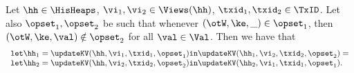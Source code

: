 
\begin{proposition}
Let $\hh \in \HisHeaps$, $\vi_1, \vi_2 \in \Views(\hh)$, 
$\txid_1, \txid_2 \in \TxID$. 
Let also $\opset_1, \opset_2$ be such that whenever 
$(\otW, \ke, \_) \in \opset_1$, then $(\otW, \ke, \val) \notin \opset_2$ 
for all $\val \in \Val$. Then we have that
\[
\begin{array}{l}
\mathtt{let } \hh_1 = \updateKV(\hh, \vi_1, \txid_1, \opset_1) \mathtt{ in } \updateKV(\hh_1, \vi_2, \txid_2, \opset_2) = \\
\mathtt{let } \hh_2 = \updateKV(\hh, \vi_2, \txid_2, \opset_2) \mathtt{ in } \updateKV(\hh_2, \vi_1, \txid_1, \opset_1).
\end{array}
\]
\end{proposition}

